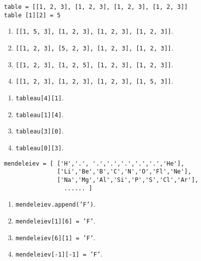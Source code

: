 \begin{lstlisting}
table = [[1, 2, 3], [1, 2, 3], [1, 2, 3], [1, 2, 3]]
table [1][2] = 5
\end{lstlisting}
\begin{enumerate}
\item \texttt{[[1, 5, 3], [1, 2, 3], [1, 2, 3], [1, 2, 3]]}.
\item \texttt{[[1, 2, 3], [5, 2, 3], [1, 2, 3], [1, 2, 3]]}.
\item \texttt{[[1, 2, 3], [1, 2, 5], [1, 2, 3], [1, 2, 3]]}. %
\item \texttt{[[1, 2, 3], [1, 2, 3], [1, 2, 3], [1, 5, 3]]}.
\end{enumerate}

\begin{enumerate}
\item \texttt{tableau[4][1]}.
\item \texttt{tableau[1][4]}.
\item \texttt{tableau[3][0]}. %
\item \texttt{tableau[0][3]}.
\end{enumerate}

\begin{lstlisting}
mendeleiev = [ ['H','.', '.','.','.','.','.','He'],
               ['Li','Be','B','C','N','O','Fl','Ne'],
               ['Na','Mg','Al','Si','P','S','Cl','Ar'],
                 ...... ]
\end{lstlisting}
\begin{enumerate}
\item \texttt{mendeleiev.append('F')}.
\item \texttt{mendeleiev[1][6] = 'F'}. %
\item \texttt{mendeleiev[6][1] = 'F'}.
\item \texttt{mendeleiev[-1][-1] = 'F'}.
\end{enumerate}

